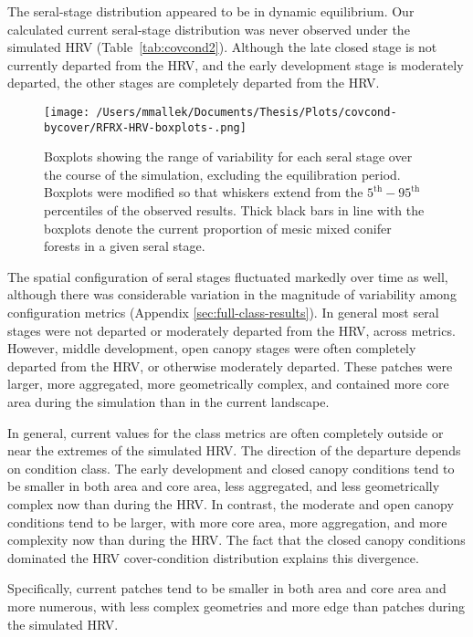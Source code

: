 The seral-stage distribution appeared to be in dynamic equilibrium. Our calculated current seral-stage distribution was never observed under the simulated HRV (Table~\ref{tab:covcond2}). Although the late closed stage is not currently departed from the HRV, and the early development stage is moderately departed, the other stages are completely departed from the HRV.

\begin{figure}[!htbp]
  \centering
    \texttt{[image: /Users/mmallek/Documents/Thesis/Plots/covcond-bycover/RFRX-HRV-boxplots-.png]}
  \caption{Boxplots showing the range of variability for each seral stage over the course of the simulation, excluding the equilibration period. Boxplots were modified so that whiskers extend from the $5^{\text{th}} - 95^{\text{th}}$ percentiles of the observed results. Thick black bars in line with the boxplots denote the current proportion of mesic mixed conifer forests in a given seral stage.} 
  \label{fig:covcond_rfrx_boxplots}
\end{figure}

The spatial configuration of seral stages fluctuated markedly over time as well, although there was considerable variation in the magnitude of variability among configuration metrics (Appendix \ref{sec:full-class-results}). In general most seral stages were not departed or moderately departed from the HRV, across metrics. However, middle development, open canopy stages were often completely departed from the HRV, or otherwise moderately departed. These patches were larger, more aggregated, more geometrically complex, and contained more core area during the simulation than in the current landscape.

In general, current values for the class metrics are often completely outside or near the extremes of the simulated HRV. The direction of the departure depends on condition class. The early development and closed canopy conditions tend to be smaller in both area and core area, less aggregated, and less geometrically complex now than during the HRV. In contrast, the moderate and open canopy conditions tend to be larger, with more core area, more aggregation, and more complexity now than during the HRV. The fact that the closed canopy conditions dominated the HRV cover-condition distribution explains this divergence.

Specifically, current patches tend to be smaller in both area and core area and more numerous, with less complex geometries and more edge than patches during the simulated HRV.


